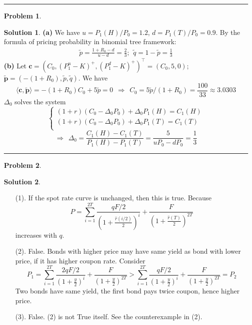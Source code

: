 \documentclass[a4paper, 10pt]{article}
\theoremstyle{definition}
\newtheorem{problem}{Problem}
\theoremstyle{hSol}
\newtheorem*{solution}{Solution}
\begin{document}
\noindent\rule{16cm}{0.4pt}
\begin{problem}
\end{problem}
\begin{solution} \textbf{(a)} We have $u=P_1(H)/P_0 = 1.2$, $d=P_1(T)/P_0 =0.9$. By the formula of pricing probability in binomial tree framework:
\begin{equation}
  \begin{split}
    \tilde{p} = \frac{1+R_0-d}{u-d}= \frac{2}{3};~~ \tilde{q} = 1- \tilde{p} = \frac{1}{3} 
  \end{split}
\end{equation}
\textbf{(b)} Let $\bm{c} = (C_0, (P_1^u-K)^+, (P_1^d-K)^+)^{\top} = (C_0, 5, 0)$; $\tilde{\bm{p}} = (-(1+R_0), \tilde{p}, \tilde{q})$. We have
\begin{equation}
  \langle \bm{c}, \tilde{\bm{p}} \rangle = -(1+R_0)C_0 + 5 \tilde{p} = 0~~\Rightarrow~~C_0 = 5 \tilde{p} / (1+R_0) = \frac{100}{33} \approx 3.0303
\end{equation}
$\Delta_0$ solves the system
\begin{equation}
  \begin{cases}
  (1+r)(C_0 - \Delta_0P_0) + \Delta_0P_1(H) = C_1(H)\\
  (1+r)(C_0 - \Delta_0P_0) + \Delta_0P_1(T) = C_1(T)\\
  \end{cases}
\end{equation}
\begin{equation}
  \Rightarrow~~\Delta_0 = \frac{C_1(H) - C_1(T)}{P_1(H) - P_1(T)} = \frac{5}{uP_0 - dP_0} = \frac{1}{3}
\end{equation}
\end{solution}

\noindent\rule{16cm}{0.4pt}
\begin{problem}
\end{problem}
\begin{solution}
\begin{itemize}
  \item[(1).] If the spot rate curve is unchanged, then this is true. Because
  $$
  P = \sum_{i=1}^{2T} \frac{qF/2}{(1+\frac{\hat{r}(i/2)}{2})^i} + \frac{F}{(1+\frac{\hat{r}(T)}{2})^{2T}} 
  $$
  increases with $q$.
  \item[(2).] False. Bonds with higher price may have same yield as bond with lower price, if it has higher coupon rate. Consider
  $$
  P_1 = \sum_{i=1}^{2T} \frac{2qF/2}{(1+\frac{y}{2})^i} + \frac{F}{(1+\frac{y}{2})^{2T}} > \sum_{i=1}^{2T} \frac{qF/2}{(1+\frac{y}{2})^i} + \frac{F}{(1+\frac{y}{2})^{2T}} = P_2
  $$
  Two bonds have same yield, the first bond pays twice coupon, hence higher price.
  \item[(3).] False. (2) is not True itself. See the counterexample in (2).
\end{itemize}
\end{solution}
\end{document}

